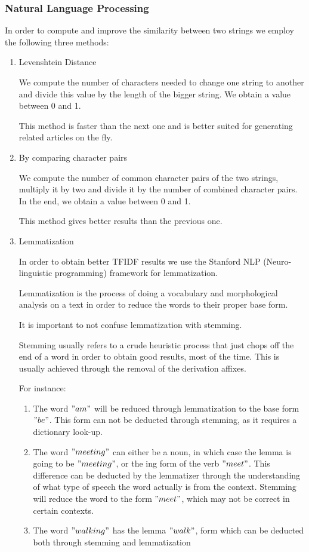\subsubsection{Natural Language Processing}
\label{sec:natural-language-processing}
In order to compute and improve the similarity between two strings we employ the following three methods:
\begin{enumerate}
	\item Levenshtein Distance

		We compute the number of characters needed to change one string to another and divide this value by the length of the bigger string. We obtain a value between 0 and 1.
		
		This method is faster than the next one and is better suited for generating related articles on the fly.

	\item By comparing character pairs
	
		We compute the number of common character pairs of the two strings, multiply it by two and divide it by the number of combined character pairs. In the end, we obtain a value between 0 and 1.
		
		This method gives better results than the previous one.
	\item Lemmatization
		
		In order to obtain better TFIDF results we use the Stanford NLP (Neuro-linguistic programming) framework for lemmatization.

		Lemmatization is the process of doing a vocabulary and morphological analysis on a text in order to reduce the words to their proper base form.

		It is important to not confuse lemmatization with stemming.

		Stemming usually refers to a crude heuristic process that just chops off the end of a word in order to obtain good results, most of the time. This is usually achieved through the removal of the derivation affixes.

		For instance:
		\begin{enumerate}
			\item The word $"am"$ will be reduced through lemmatization to the base form $"be"$. This form can not be deducted through stemming, as it requires a dictionary look-up.
			\item The word $"meeting"$ can either be a noun, in which case the lemma is going to be $"meeting"$, or the ing form of the verb $"meet"$. This difference can be deducted by the lemmatizer through the understanding of what type of speech the word actually is from the context. Stemming will reduce the word to the form $"meet"$, which may not be correct in certain contexts.
			\item The word $"walking"$ has the lemma $"walk"$, form which can be deducted both through stemming and lemmatization

		\end{enumerate}

\end{enumerate}

